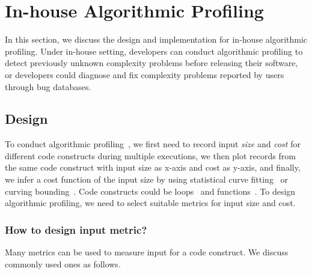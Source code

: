 
\newpage
\section{In-house Algorithmic Profiling}
\label{sec:inhouse}

In this section, we discuss the design and implementation for in-house algorithmic profiling.
Under in-house setting, 
developers can conduct algorithmic profiling 
to detect previously unknown complexity problems before releasing their software, 
or developers could diagnose and fix complexity problems 
reported by users through bug databases.


\subsection{Design}
To conduct algorithmic profiling~\cite{Aprof1,Aprof2,AlgoProf},
we first need to record input \textit{size} and \textit{cost} for different code constructs 
during multiple executions,
we then plot records from the same code construct with input size as x-axis and cost as y-axis, 
and finally, we infer a cost function of the input size by using 
statistical curve fitting~\cite{curve-fitting} 
or curving bounding~\cite{curve-bounding}. 
Code constructs could be loops~\cite{AlgoProf} and functions~\cite{Aprof1,Aprof2}. 
To design algorithmic profiling, we need to select 
suitable metrics for input size and cost. 




\subsubsection{How to design input metric?}
Many metrics can be used to measure input for a code construct. 
We discuss commonly used ones as follows.

